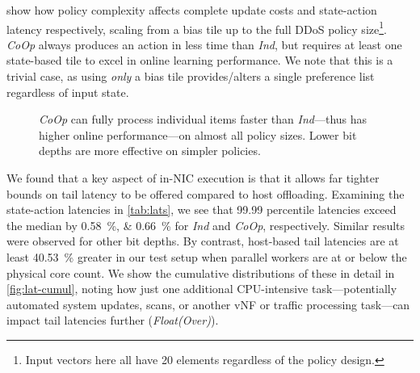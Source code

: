 \documentclass[sigconf,natbib=false]{acmart}
\newcommand{\Coopfw}{\emph{CoOp}}
\newcommand{\Indfw}{\emph{Ind}}
\begin{document}
 show how policy complexity affects complete update costs and state-action latency respectively, scaling from a bias tile up to the full DDoS policy size\footnote{Input vectors here all have 20 elements regardless of the policy design.}.
\Coopfw{} always produces an action in less time than \Indfw{}, but requires at least one state-based tile to excel in online learning performance.
We note that this is a trivial case, as using \emph{only} a bias tile provides/alters a single preference list regardless of input state.

\begin{figure}
	\caption{\Coopfw{} can fully process individual items faster than \Indfw{}---thus has higher online performance---on almost all policy sizes. Lower bit depths are more effective on simpler policies.\label{fig:vary-work}}
\end{figure}

We found that a key aspect of in-NIC execution is that it allows far tighter bounds on tail latency to be offered compared to host offloading.
Examining the state-action latencies in \cref{tab:lats}, we see that \num{99.99} percentile latencies exceed the median by \SIlist{0.58;0.66}{\percent} for \Indfw{} and \Coopfw{}, respectively.
Similar results were observed for other bit depths.
By contrast, host-based tail latencies are at least \SI{40.53}{\percent} greater in our test setup when parallel workers are at or below the physical core count.
We show the cumulative distributions of these in detail in \cref{fig:lat-cumul}, noting how just one additional CPU-intensive task---potentially automated system updates, scans, or another vNF or traffic processing task---can impact tail latencies further (\emph{Float(Over)}).
\end{document}
